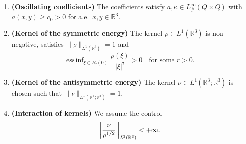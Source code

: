 \documentclass[reqno,11pt]{amsart}
\numberwithin{equation}{section}
\theoremstyle{thmlemcorr}
\numberwithin{theorem}{section}
\theoremstyle{thmlemcorr*}
\theoremstyle{defi}
\theoremstyle{remexample}
\theoremstyle{ass}
\newcommand{\R}{\mathbb{R}}
\newcommand{\dd}{\,\mathrm{d}}
\DeclareMathOperator*{\essinf}{ess\,inf}
\DeclarePairedDelimiter{\norm}{\lVert}{\rVert}
\newcommand{\1}{\mathds{1}}
\begin{document}
\begin{enumerate}[label=(H\arabic*)]
    \item\label{H1} \textbf{(Oscillating coefficients)}
        The coefficients satisfy $a, \kappa \in L^{\infty}_{\#}(Q\times Q)$ with $a(x,y) \geq a_0 >0$ for a.e.~$x,y \in \R^3$.
    \item\label{H2} \textbf{(Kernel of the symmetric energy)}
        The kernel $\rho \in L^1(\R^3)$ is non-negative, satisfies $\|\rho\|_{L^1(\R^3)}=1$ and
        \begin{equation}\label{eq:rhocoercive}
            \essinf_{\xi \in B_r(0)}\frac{\rho(\xi)}{|\xi|^2}>0 \quad \text{for some $r>0$.} 
        \end{equation} 
    \item\label{H3} \textbf{(Kernel of the antisymmetric energy)}
        The kernel $\nu \in L^1(\R^3;\R^3)$ is chosen such that $\|\nu\|_{L^1(\R^3; \R^3)}=1$.
    \item\label{H4} \textbf{(Interaction of kernels)}
        We assume the control
    \begin{equation}\label{eq:ratiobound}
    \norm*{\frac{\nu}{\rho^{1/2}}}_{L^{2}(\R^3)}<+ \infty.
    \end{equation}
\end{enumerate}
\end{document}
